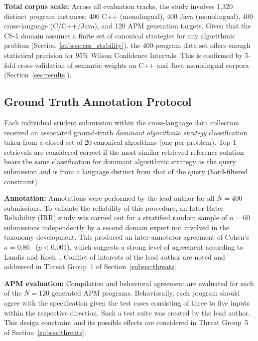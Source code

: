 \textbf{Total corpus scale:} Across all evaluation tracks, the study involves 1,320 distinct program instances: 400 C++ (monolingual), 400 Java (monolingual), 400 cross-language (C/C++/Java), and 120 APM generation targets. Given that the CS-1 domain assumes a finite set of canonical strategies for any algorithmic problem (Section~\ref{subsec:ces_stability}), the 400-program data set offers enough statistical precision for 95\% Wilson Confidence Intervals. This is confirmed by 5-fold cross-validation of semantic weights on C++ and Java monolingual corpora (Section~\ref{sec:results}).

\subsection{Ground Truth Annotation Protocol}
\label{subsec:ground_truth}

Each individual student submission within the cross-language data collection received an associated ground-truth \textit{dominant algorithmic strategy} classification taken from a closed set of 20 canonical algorithms (one per problem). Top-1 retrievals are considered correct if the most similar retrieved reference solution bears the same classification for dominant algorithmic strategy as the query submission and is from a language distinct from that of the query (hard-filtered constraint).


\textbf{Annotation:} Annotations were performed by the lead author for all $N=400$ submissions. To validate the reliability of this procedure, an Inter-Rater Reliability (IRR) study was carried out for a stratified random sample of $n=60$ submissions independently by a second domain expert not involved in the taxonomy development. This produced an inter-annotator agreement of Cohen's $\kappa = 0.86$~\cite{ref_cohen1960} ($p < 0.001$), which suggests a strong level of agreement according to Landis and Koch~\cite{ref_landis1977}. Conflict of interests of the lead author are noted and addressed in Threat Group~1 of Section~\ref{subsec:threats}.

\textbf{APM evaluation:} Compilation and behavioral agreement are evaluated for each of the $N=120$ generated APM programs. Behaviorally, each program should agree with the specification given the test cases consisting of three to five inputs within the respective direction. Such a test suite was created by the lead author. This design constraint and its possible effects are considered in Threat Group~5 of Section~\ref{subsec:threats}.

